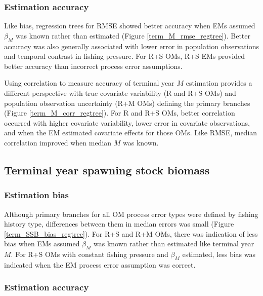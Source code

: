 \documentclass[
  12pt,
]{article}
\begin{document}
\subsubsection*{Estimation accuracy}\label{estimation-accuracy}

Like bias, regression trees for RMSE showed better accuracy when EMs
assumed \(\beta_M\) was known rather than estimated (Figure
\ref{term_M_rmse_regtree}). Better accuracy was also generally
associated with lower error in population observations and temporal
contrast in fishing pressure. For R+S OMs, R+S EMs provided better
accuracy than incorrect process error assumptions.

Using correlation to measure accuracy of terminal year \(M\) estimation
provides a different perspective with true covariate variability (R and
R+S OMs) and population observation uncertainty (R+M OMs) defining the
primary branches (Figure \ref{term_M_corr_regtree}). For R and R+S OMs,
better correlation occurred with higher covariate variability, lower
error in covariate observations, and when the EM estimated covariate
effects for those OMs. Like RMSE, median correlation improved when
median \(M\) was known.

\subsection*{Terminal year spawning stock
biomass}\label{terminal-year-spawning-stock-biomass}

\subsubsection*{Estimation bias}\label{estimation-bias-3}

Although primary branches for all OM process error types were defined by
fishing history type, differences between them in median errors was
small (Figure \ref{term_SSB_bias_regtree}). For R+S and R+M OMs, there
was indication of less bias when EMs assumed \(\beta_M\) was known
rather than estimated like terminal year \(M\). For R+S OMs with
constant fishing pressure and \(\beta_M\) estimated, less bias was
indicated when the EM process error assumption was correct.

\subsubsection*{Estimation accuracy}\label{estimation-accuracy-1}
\end{document}
